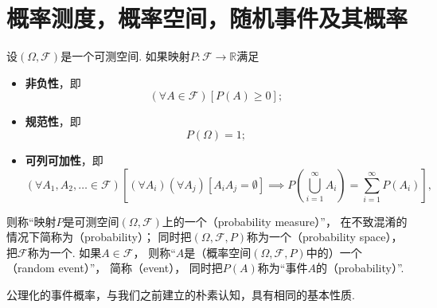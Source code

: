 \section{概率测度，概率空间，随机事件及其概率}
\begin{definition}
设\((\Omega,\mathcal{F})\)是一个可测空间.
如果映射\(P\colon \mathcal{F} \to \mathbb{R}\)满足\begin{itemize}
	\item {\rm\bf 非负性}，即\begin{equation*}
		(\forall A \in \mathcal{F})
		[
			P(A) \geq 0
		];
	\end{equation*}

	\item {\rm\bf 规范性}，即\begin{equation*}
		P(\Omega) = 1;
	\end{equation*}

	\item {\rm\bf 可列可加性}，即\begin{equation*}
		(\forall A_1,A_2,\dotsc \in \mathcal{F})
		\left[
			(\forall A_i)(\forall A_j)
			[
				A_i A_j = \emptyset
			]
			\implies
			P\left( \bigcup_{i=1}^\infty A_i \right)
			= \sum_{i=1}^\infty P(A_i)
		\right],
	\end{equation*}
\end{itemize}
则称“映射\(P\)是可测空间\((\Omega,\mathcal{F})\)上的一个（probability measure）”，
在不致混淆的情况下简称为（probability）；
同时把\((\Omega,\mathcal{F},P)\)称为一个（probability space），
把\(\mathcal{F}\)称为一个.
如果\(A \in \mathcal{F}\)，
则称“\(A\)是（概率空间\((\Omega,\mathcal{F},P)\)中的）一个（random event）”，
简称（event），
同时把\(P(A)\)称为“事件\(A\)的（probability）”.
\end{definition}

公理化的事件概率，与我们之前建立的朴素认知，具有相同的基本性质.

